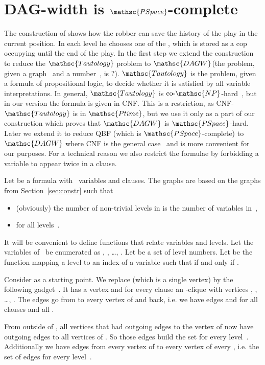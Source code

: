 \documentclass[authoryear]{article}
\makeatletter
\theoremstyle{definition}
\newcommand{\0}{\emptyset}
\newcommand{\ptime}{\ensuremath{\mathsc{Ptime}}\xspace}
\newcommand{\conp}{\ensuremath{\text{co-}\mathsc{NP}}\xspace}
\newcommand{\pspace}{\ensuremath{\mathsc{PSpace}}\xspace}
\newcommand{\DAGWprob}{\ensuremath{\mathsc{DAGW}}\xspace}
\newcommand{\taut}{\ensuremath{\mathsc{Tautology}}\xspace}
\newcommand{\dagw}{DAG-{}width\xspace}
\newcommand{\ie}{i.e.\@\xspace}
\makeatother
\begin{document}
\section{\dagw is \pspace-complete}
\label{sec:pspace}

The construction of  shows how the robber can save the history of the
play in the current position. In each level  he chooses one of the
, which is stored as a cop occupying  until the end of the
play. In the first step we extend the construction to reduce the \taut problem
to \DAGWprob (the problem, given a graph~ and a number~, is
?).  \taut is the problem, given a formula of propositional
logic, to decide whether it is satisfied by all variable interpretations. In
general, \taut is \conp-hard~\cite[Problem {[}LO8{]}]{GareyJoh79}, but in our
version the formula is given in CNF. This is a restriction, as CNF-\taut is in
\ptime, but we use it only as a part of our construction which proves that
\DAGWprob is \pspace-hard. Later we extend it to reduce QBF (which is
\pspace-complete) to \DAGWprob where CNF is the general case~\cite[Theorem
7.10]{GareyJoh79} and is more convenient for our purposes. For a technical
reason we also restrict the formulae by forbidding a variable to appear twice in
a clause.

Let  be a formula with~ variables and  clauses. The graphs 
are based on the graphs  from Section~\ref{sec:constr} such that
\begin{itemize}
\item (obviously) the number  of non-trivial levels in  is
  the number of variables in~,

\item  for all levels~.
\end{itemize}

It will be convenient to define functions that relate variables and levels.
Let the variables of~ be enumerated as , , \ldots, . Let 
 be a set of level numbers. Let  be the function mapping a level to an 
index of a variable such that  if and only if .

Consider  as a starting point. We replace 
(which is a single vertex) by the following gadget~. It has a vertex 
and for every clause  an -clique
 with vertices , , \ldots, . The edges go from
 to every vertex of  and back, \ie we have edges  and
 for all clauses  and all . 

From outside of , all vertices that had outgoing edges to the vertex of
 now have outgoing edges to all vertices of . So those
edges build the set  for
every level~. Additionally we have edges from every vertex of
 to every vertex of every , \ie the set of edges
 for every level~. 
\end{document}
